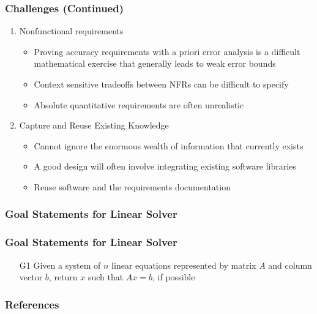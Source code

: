 \documentclass[t,12pt,numbers,fleqn]{beamer}
\newcounter{temp}
\begin{document}

\begin{frame}

\frametitle{Challenges (Continued)}

\begin{enumerate}
\setcounter{enumi}{\value{temp}}
\item Nonfunctional requirements
\begin{itemize}
\item Proving accuracy requirements with a priori error analysis is a difficult mathematical exercise that generally
leads to weak error bounds
\item Context sensitive tradeoffs between NFRs can be difficult to specify
\item Absolute quantitative requirements are often unrealistic
\end{itemize}
\item Capture and Reuse Existing Knowledge
\begin{itemize}
\item Cannot ignore the enormous wealth of information that currently exists %
\item A good design will often involve integrating existing software libraries
\item Reuse software and the requirements documentation
\end{itemize}

\setcounter{temp}{\value{enumi}}
\end{enumerate}

\end{frame}


\begin{frame}
\frametitle{Goal Statements for Linear Solver}


\end{frame}


\begin{frame}
\frametitle{Goal Statements for Linear Solver}

\begin{itemize}
	
\item[G1] Given a system of $n$ linear equations represented by matrix $A$ and
  column vector $b$, return $x$ such that $Ax = b$, if possible

\end{itemize}

\end{frame}


\begin{frame}[allowframebreaks]
\frametitle{References}



\end{frame}

\end{document}
